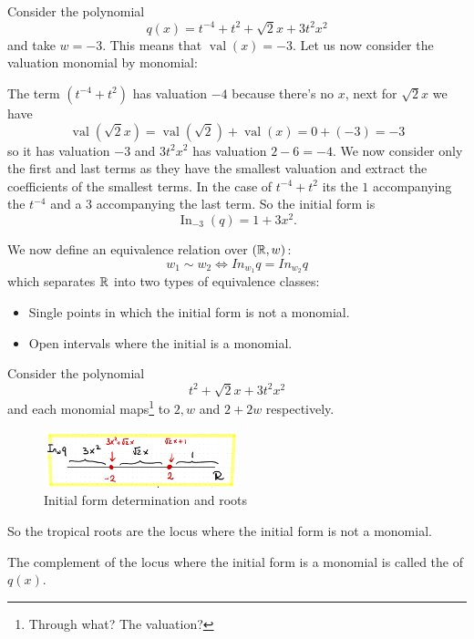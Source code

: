 \documentclass[12pt]{memoir}
\DeclareMathOperator{\val}{val}
\begin{document}
\begin{Ex}
    Consider the polynomial 
    $$q(x)=t^{-4}+t^{2}+\sqrt{2}x+3t^2x^2$$
    and take $w=-3$. This means that $\val(x)=-3$. Let us now consider the valuation monomial by monomial:\par 
    The term $(t^{-4}+t^{2})$ has valuation $-4$ because there's no $x$, next for $\sqrt{2}x$ we have
    $$\val(\sqrt{2}x)=\val(\sqrt{2})+\val(x)=0+(-3)=-3$$
    so it has valuation $-3$ and $3t^2x^2$ has valuation $2-6=-4$. We now consider only the first and last terms as they have the smallest valuation and extract the coefficients of the smallest terms. In the case of $t^{-4}+t^{2}$ its the $1$ accompanying the $t^{-4}$ and a $3$ accompanying the last term. So the initial form is 
    $$\operatorname{In}_{-3}(q)=1+3x^2.$$
\end{Ex}

\par 
We now define an equivalence relation over $(\mathbb{R},w)$: 
$$w_1\sim w_2\iff In_{w_1}q=In_{w_2}q$$ 
which separates $\mathbb{R}$ into two types of equivalence classes:
\begin{itemize}
    \item Single points in which the initial form is not a monomial.
    \item Open intervals where the initial is a monomial.
\end{itemize}

\begin{Ex}
    Consider the polynomial 
    $$t^2+\sqrt2x+3t^2x^2$$
    and each monomial maps\footnote{Through what? The valuation?} to $2,w$ and $2+2w$ respectively.
    \begin{figure}[h!]
        \centering
        \includegraphics[width=0.5\textwidth]{figs/fig6-3-InitialFormExample.png}
        \caption{Initial form determination and roots}
        \label{fig:6.3-InitialFormExample}
    \end{figure}
    So the tropical roots are the locus where the initial form is not a monomial.
\end{Ex}

\begin{Def}
    The complement of the locus where the initial form is a monomial is called the  of $q(x)$.
\end{Def}
\end{document}
